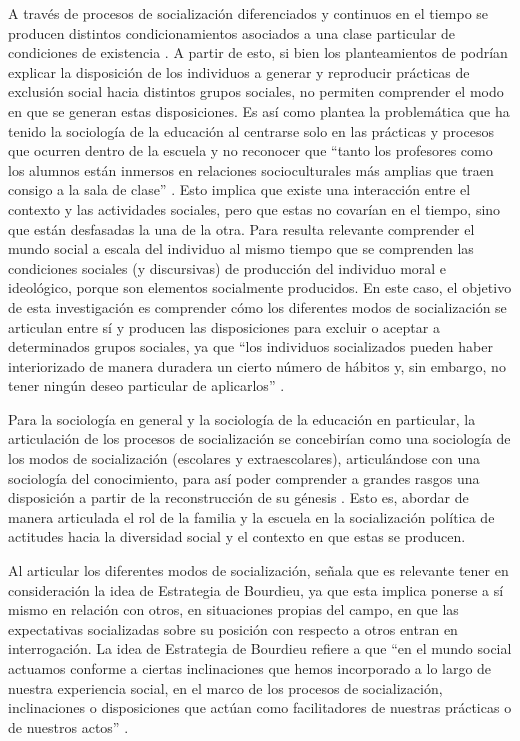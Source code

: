 \documentclass[12pt,twoside]{templates/facsothesis}
\begin{document}
A través de procesos de socialización diferenciados y continuos en el tiempo se producen distintos condicionamientos asociados a una clase particular de condiciones de existencia \citep{bourdieu_sentido_2007}. A partir de esto, si bien los planteamientos de \citet{bourdieu_sentido_2007} podrían explicar la disposición de los individuos a generar y reproducir prácticas de exclusión social hacia distintos grupos sociales, no permiten comprender el modo en que se generan estas disposiciones. Es así como \citet{archer_teoria_2009} plantea la problemática que ha tenido la sociología de la educación al centrarse solo en las prácticas y procesos que ocurren dentro de la escuela y no reconocer que ``tanto los profesores como los alumnos están inmersos en relaciones socioculturales más amplias que traen consigo a la sala de clase'' \citep[p.~39]{archer_teoria_2009}. Esto implica que existe una interacción entre el contexto y las actividades sociales, pero que estas no covarían en el tiempo, sino que están desfasadas la una de la otra. Para \citet{lahire_teoria_2012} resulta relevante comprender el mundo social a escala del individuo al mismo tiempo que se comprenden las condiciones sociales (y discursivas) de producción del individuo moral e ideológico, porque son elementos socialmente producidos. En este caso, el objetivo de esta investigación es comprender cómo los diferentes modos de socialización se articulan entre sí y producen las disposiciones para excluir o aceptar a determinados grupos sociales, ya que ``los individuos socializados pueden haber interiorizado de manera duradera un cierto número de hábitos y, sin embargo, no tener ningún deseo particular de aplicarlos'' \citep[p.~87]{lahire_teoria_2012}.

Para la sociología en general y la sociología de la educación en particular, la articulación de los procesos de socialización se concebirían como una sociología de los modos de socialización (escolares y extraescolares), articulándose con una sociología del conocimiento, para así poder comprender a grandes rasgos una disposición a partir de la reconstrucción de su génesis \citep{lahire_teoria_2012}. Esto es, abordar de manera articulada el rol de la familia y la escuela en la socialización política de actitudes hacia la diversidad social y el contexto en que estas se producen.

Al articular los diferentes modos de socialización, \citet{aedohenriquez_habitus_2015} señala que es relevante tener en consideración la idea de Estrategia de Bourdieu, ya que esta implica ponerse a sí mismo en relación con otros, en situaciones propias del campo, en que las expectativas socializadas sobre su posición con respecto a otros entran en interrogación. La idea de Estrategia de Bourdieu refiere a que ``en el mundo social actuamos conforme a ciertas inclinaciones que hemos incorporado a lo largo de nuestra experiencia social, en el marco de los procesos de socialización, inclinaciones o disposiciones que actúan como facilitadores de nuestras prácticas o de nuestros actos'' \citep[p.~280]{aguilar_habitus_2017}.
\end{document}
